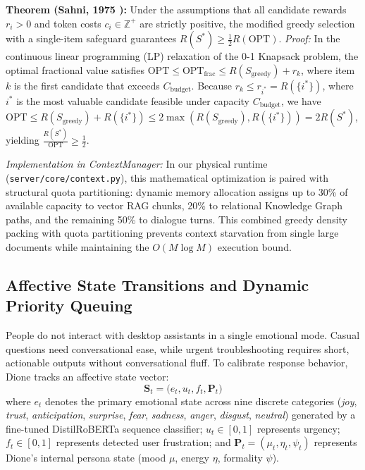 \documentclass[conference,a4paper]{IEEEtran}
\begin{document}
\textbf{Theorem (Sahni, 1975 \cite{sahni1975approximate}):} Under the assumptions that all candidate rewards $r_i > 0$ and token costs $c_i \in \mathbb{Z}^+$ are strictly positive, the modified greedy selection with a single-item safeguard guarantees $R(S^*) \ge \frac{1}{2} R(\text{OPT})$.  
\textit{Proof:} In the continuous linear programming (LP) relaxation of the 0-1 Knapsack problem, the optimal fractional value satisfies $\text{OPT} \le \text{OPT}_{\text{frac}} \le R(S_{\text{greedy}}) + r_k$, where item $k$ is the first candidate that exceeds $C_{\text{budget}}$. Because $r_k \le r_{i^*} = R(\{i^*\})$, where $i^*$ is the most valuable candidate feasible under capacity $C_{\text{budget}}$, we have $\text{OPT} \le R(S_{\text{greedy}}) + R(\{i^*\}) \le 2 \max\left(R(S_{\text{greedy}}), R(\{i^*\})\right) = 2 R(S^*)$, yielding $\frac{R(S^*)}{\text{OPT}} \ge \frac{1}{2}$. 

\textit{Implementation in ContextManager:} In our physical runtime (\texttt{server/core/context.py}), this mathematical optimization is paired with structural quota partitioning: dynamic memory allocation assigns up to 30\% of available capacity to vector RAG chunks, 20\% to relational Knowledge Graph paths, and the remaining 50\% to dialogue turns. This combined greedy density packing with quota partitioning prevents context starvation from single large documents while maintaining the $O(M \log M)$ execution bound.

\subsection{Affective State Transitions and Dynamic Priority Queuing}
People do not interact with desktop assistants in a single emotional mode. Casual questions need conversational ease, while urgent troubleshooting requires short, actionable outputs without conversational fluff. To calibrate response behavior, Dione tracks an affective state vector:
\begin{equation}
\mathbf{S}_t = \big(e_t, u_t, f_t, \mathbf{P}_t\big)
\end{equation}
where $e_t$ denotes the primary emotional state across nine discrete categories (\textit{joy}, \textit{trust}, \textit{anticipation}, \textit{surprise}, \textit{fear}, \textit{sadness}, \textit{anger}, \textit{disgust}, \textit{neutral}) generated by a fine-tuned DistilRoBERTa sequence classifier; $u_t \in [0, 1]$ represents urgency; $f_t \in [0, 1]$ represents detected user frustration; and $\mathbf{P}_t = (\mu_t, \eta_t, \psi_t)$ represents Dione's internal persona state (mood $\mu$, energy $\eta$, formality $\psi$).
\end{document}
